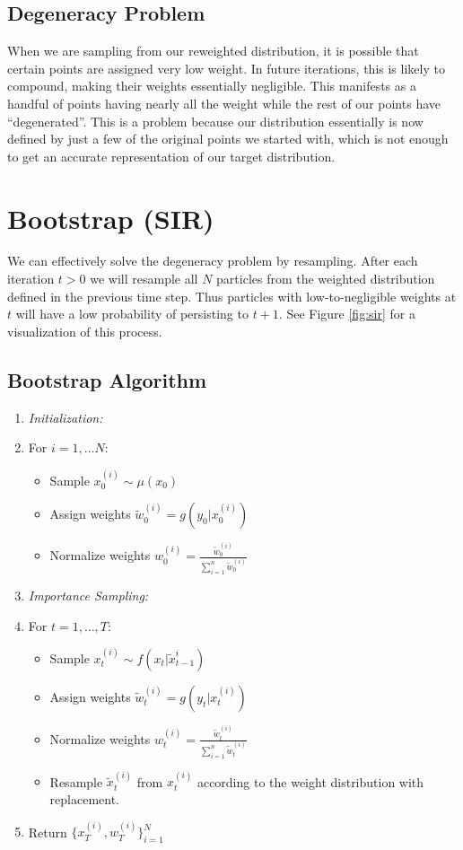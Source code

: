 \documentclass{article}
\begin{document}
\subsection{Degeneracy Problem}
When we are sampling from our reweighted distribution, it is possible that certain points are assigned very low weight. In future iterations, this is likely to compound, making their weights essentially negligible. This manifests as a handful of points having nearly all the weight while the rest of our points have ``degenerated''. This is a problem because our distribution essentially is now defined by just a few of the original points we started with, which is not enough to get an accurate representation of our target distribution.


\section{Bootstrap (SIR)}
We can effectively solve the degeneracy problem by resampling. After each iteration $t>0$ we will resample all $N$ particles from the weighted distribution defined in the previous time step. Thus particles with low-to-negligible weights at $t$ will have a low probability of persisting to $t+1$. See Figure \ref{fig:sir} for a visualization of this process.

\subsection{Bootstrap Algorithm}
\begin{enumerate}
\item \textit{Initialization:}
\item[] For $i=1,\dots N$:
\begin{itemize}
\item[] Sample $x_0^{(i)} \sim \mu(x_0)$
\item[] Assign weights $\widetilde{w}_0^{(i)} = g(y_0|x_0^{(i)})$
\item[] Normalize weights $w_0^{(i)} = \frac{\widetilde{w}_0^{(i)}}{\sum_{i=1}^{n} \widetilde{w}_0^{(i)}}$
\end{itemize}
\item \textit{Importance Sampling:}
\item[] For $t=1,\dots,T$:
\begin{itemize}
\item[] Sample $x_t^{(i)} \sim f(x_t|\widetilde{x}_{t-1}^{i})$
\item[] Assign weights $\widetilde{w}_t^{(i)} = g(y_t|x_t^{(i)})$
\item[] Normalize weights $w_t^{(i)} = \frac{\widetilde{w}_t^{(i)}}{\sum_{i=1}^{n} \widetilde{w}_t^{(i)}}$
\item[] Resample $\widetilde{x}_t^{(i)}$ from $x_t^{(i)}$ according to the weight distribution with replacement.
\end{itemize}
\item Return $\{x_T^{(i)},w_T^{(i)}\}_{i=1}^N$
\end{enumerate}
\end{document}
